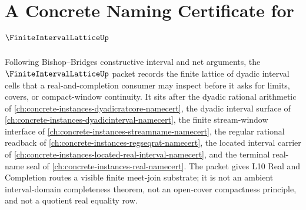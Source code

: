 \chapter{A Concrete Naming Certificate for $\FiniteIntervalLatticeUp$}
\label{ch:concrete-instances-finite-interval-lattice-namecert}

Following Bishop--Bridges constructive interval and net arguments, the $\FiniteIntervalLatticeUp$ packet records the finite lattice of dyadic interval cells that a real-and-completion consumer may inspect before it asks for limits, covers, or compact-window continuity. It sits after the dyadic rational arithmetic of \autoref{ch:concrete-instances-dyadicratcore-namecert}, the dyadic interval surface of \autoref{ch:concrete-instances-dyadicinterval-namecert}, the finite stream-window interface of \autoref{ch:concrete-instances-streamname-namecert}, the regular rational readback of \autoref{ch:concrete-instances-regseqrat-namecert}, the located interval carrier of \autoref{ch:concrete-instances-located-real-interval-namecert}, and the terminal real-name seal of \autoref{ch:concrete-instances-real-namecert}. The packet gives L10 Real and Completion routes a visible finite meet-join substrate; it is not an ambient interval-domain completeness theorem, not an open-cover compactness principle, and not a quotient real equality row.

